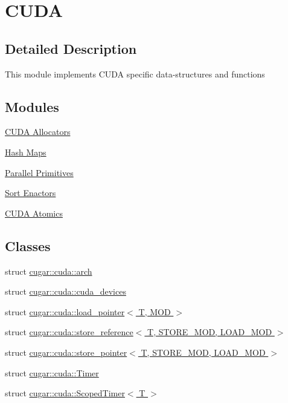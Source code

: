\hypertarget{group___c_u_d_a_module}{}\section{C\+U\+DA}
\label{group___c_u_d_a_module}


\subsection{Detailed Description}
This module implements C\+U\+DA specific data-\/structures and functions \subsection*{Modules}
\begin{DoxyCompactItemize}
\item 
\hyperlink{group___c_u_d_a_allocators_modules}{C\+U\+D\+A Allocators}
\item 
\hyperlink{group___hash_maps_module}{Hash Maps}
\item 
\hyperlink{group___c_u_d_a_primitives}{Parallel Primitives}
\item 
\hyperlink{group___sort_enactors}{Sort Enactors}
\item 
\hyperlink{group___c_u_d_a_atomics_module}{C\+U\+D\+A Atomics}
\end{DoxyCompactItemize}
\subsection*{Classes}
\begin{DoxyCompactItemize}
\item 
struct \hyperlink{structcugar_1_1cuda_1_1arch}{cugar\+::cuda\+::arch}
\item 
struct \hyperlink{structcugar_1_1cuda_1_1cuda__devices}{cugar\+::cuda\+::cuda\+\_\+devices}
\item 
struct \hyperlink{structcugar_1_1cuda_1_1load__pointer}{cugar\+::cuda\+::load\+\_\+pointer$<$ T, M\+O\+D $>$}
\item 
struct \hyperlink{structcugar_1_1cuda_1_1store__reference}{cugar\+::cuda\+::store\+\_\+reference$<$ T, S\+T\+O\+R\+E\+\_\+\+M\+O\+D, L\+O\+A\+D\+\_\+\+M\+O\+D $>$}
\item 
struct \hyperlink{structcugar_1_1cuda_1_1store__pointer}{cugar\+::cuda\+::store\+\_\+pointer$<$ T, S\+T\+O\+R\+E\+\_\+\+M\+O\+D, L\+O\+A\+D\+\_\+\+M\+O\+D $>$}
\item 
struct \hyperlink{structcugar_1_1cuda_1_1_timer}{cugar\+::cuda\+::\+Timer}
\item 
struct \hyperlink{structcugar_1_1cuda_1_1_scoped_timer}{cugar\+::cuda\+::\+Scoped\+Timer$<$ T $>$}
\end{DoxyCompactItemize}
